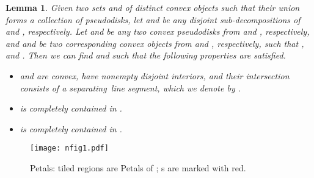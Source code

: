 \documentclass[a4paper,11pt]{article}
\newtheorem{lemma}{Lemma}
\begin{document}
\begin{lemma} \label{petalLemma}
Given two sets  and  of distinct convex objects such that their union forms a 
collection  of pseudodisks,  let 
 and  be any disjoint sub-decompositions of  and , respectively.
Let  and  be any two convex  pseudodisks from  and , respectively, and  
and  be 
two corresponding convex objects  from   and , respectively,   such that , 
 and 
. Then we can find  
and 
 such that the following 
properties are 
satisfied.

\begin{itemize}

 \item[(i)]  and  are convex,  have nonempty disjoint interiors, and their intersection consists of a separating~line segment, which we denote by .

\item[(ii)]  is completely 
contained in 
.
\item[(iii)]  is completely 
contained in .
\end{itemize}

\end{lemma}
\begin{figure}
 
    \centering

  \texttt{[image: nfig1.pdf]}
   \caption{Petals: tiled regions are Petals of ; s are marked with red.}
   \label{figPetals}
\end{figure}
\end{document}
